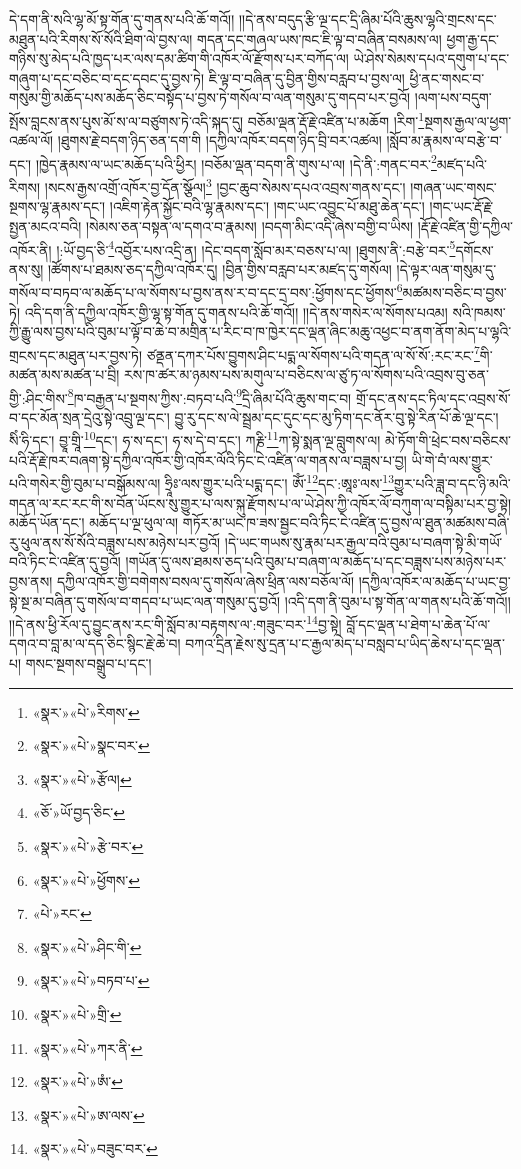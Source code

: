 དེ་དག་ནི་སའི་ལྷ་མོ་སྟ་གོན་དུ་གནས་པའི་ཆོ་གའོ།། །།དེ་ནས་བདུད་རྩི་ལྔ་དང་དྲི་ཞིམ་པོའི་ཆུས་ལྷའི་གྲངས་དང་མཐུན་པའི་རིགས་སོ་སོའི་ཐིག་ལེ་བྱས་ལ། གདན་དང་གཞལ་ཡས་ཁང་ཇི་ལྟ་བ་བཞིན་བསམས་ལ། ཕྱག་རྒྱ་དང་གཉིས་སུ་མེད་པའི་ཁྱད་པར་ལས་དམ་ཚིག་གི་འཁོར་ལོ་རྫོགས་པར་བཀོད་ལ། ཡེ་ཤེས་སེམས་དཔའ་དགུག་པ་དང་གཞུག་པ་དང་བཅིང་བ་དང་དབང་དུ་བྱས་ཏེ། ཇི་ལྟ་བ་བཞིན་དུ་བྱིན་གྱིས་བརླབ་པ་བྱས་ལ། ཕྱི་ནང་གསང་བ་གསུམ་གྱི་མཆོད་པས་མཆོད་ཅིང་བསྟོད་པ་བྱས་ཏེ་གསོལ་བ་ལན་གསུམ་དུ་གདབ་པར་བྱའོ། །ལག་པས་བདུག་སྤོས་བླངས་ནས་པུས་མོ་ས་ལ་བཙུགས་ཏེ་འདི་སྐད་དུ། བཅོམ་ལྡན་རྡོ་རྗེ་འཛིན་པ་མཆོག །རིག་\footnote{«སྣར་»«པེ་»རིགས་}སྔགས་རྒྱལ་ལ་ཕྱག་འཚལ་ལོ། །ཐུགས་རྗེ་བདག་ཉིད་ཅན་དག་གི །དཀྱིལ་འཁོར་བདག་ཉིད་བྲི་བར་འཚལ། །སློབ་མ་རྣམས་ལ་བརྩེ་བ་དང་། །ཁྱེད་རྣམས་ལ་ཡང་མཆོད་པའི་ཕྱིར། །བཅོམ་ལྡན་བདག་ནི་གུས་པ་ལ། །དེ་ནི་:གནང་བར་\footnote{«སྣར་»«པེ་»སྣང་བར་}མཛད་པའི་རིགས། །སངས་རྒྱས་འགྲོ་འཁོར་བྱ་དོན་སྩོལ།\footnote{«སྣར་»«པེ་»རྩོལ།} །བྱང་ཆུབ་སེམས་དཔའ་འབྲས་གནས་དང་། །གཞན་ཡང་གསང་སྔགས་ལྷ་རྣམས་དང་། །འཇིག་རྟེན་སྐྱོང་བའི་ལྷ་རྣམས་དང་། །གང་ཡང་འབྱུང་པོ་མཐུ་ཆེན་དང་། །གང་ཡང་རྡོ་རྗེ་སྤྱན་མངའ་བའི། །སེམས་ཅན་བསྟན་ལ་དགའ་བ་རྣམས། །བདག་མིང་འདི་ཞེས་བགྱི་བ་ཡིས། །རྡོ་རྗེ་འཛིན་གྱི་དཀྱིལ་འཁོར་ནི། །:ཡོ་བྱད་ཅི་\footnote{«ཅོ་»ཡོ་བྱད་ཅིང་}འབྱོར་པས་འདྲི་ན། །དེང་བདག་སློབ་མར་བཅས་པ་ལ། །ཐུགས་ནི་:བརྩེ་བར་\footnote{«སྣར་»«པེ་»རྩེ་བར་}དགོངས་ནས་སུ། །ཚོགས་པ་ཐམས་ཅད་དཀྱིལ་འཁོར་དུ། །བྱིན་གྱིས་བརླབ་པར་མཛད་དུ་གསོལ། །དེ་ལྟར་ལན་གསུམ་དུ་གསོལ་བ་བཏབ་ལ་མཆོད་པ་ལ་སོགས་པ་བྱས་ནས་ར་བ་དང་དྲ་བས་:ཕྱོགས་དང་ཕྱོགས་\footnote{«སྣར་»«པེ་»ཕྱོགས་}མཚམས་བཅིང་བ་བྱས་ཏེ། འདི་དག་ནི་དཀྱིལ་འཁོར་གྱི་ལྷ་སྟ་གོན་དུ་གནས་པའི་ཆོ་གའོ།། །།དེ་ནས་གསེར་ལ་སོགས་པའམ། སའི་ཁམས་ཀྱི་རྒྱུ་ལས་བྱས་པའི་བུམ་པ་ལྟོ་བ་ཆེ་བ་མགྲིན་པ་རིང་བ་ཁ་ཁྱེར་དང་ལྡན་ཞིང་མཆུ་འཕྱང་བ་ནག་ནོག་མེད་པ་ལྷའི་གྲངས་དང་མཐུན་པར་བྱས་ཏེ། ཙནྡན་དཀར་པོས་བྱུགས་ཤིང་པདྨ་ལ་སོགས་པའི་གདན་ལ་སོ་སོ་:རང་རང་\footnote{«པེ་»རང་}གི་མཚན་མས་མཚན་པ་བྲི། རས་ཁ་ཚར་མ་ཉམས་པས་མགུལ་པ་བཅིངས་ལ་ཙུ་ཏ་ལ་སོགས་པའི་འབྲས་བུ་ཅན་གྱི་:ཤིང་གིས་\footnote{«སྣར་»«པེ་»ཤིང་གི་}ཁ་བརྒྱན་པ་སྔགས་ཀྱིས་:བཏབ་པའི་\footnote{«སྣར་»«པེ་»བཏབ་པ་}དྲི་ཞིམ་པོའི་ཆུས་གང་བ། གྲོ་དང་ནས་དང་ཏིལ་དང་འབྲས་སོ་བ་དང་མོན་སྲན་དྲེའུ་སྟེ་འབྲུ་ལྔ་དང་། བྱུ་རུ་དང་ས་ལེ་སྦྲམ་དང་དུང་དང་མུ་ཏིག་དང་ནོར་བུ་སྟེ་རིན་པོ་ཆེ་ལྔ་དང་། སིཾ་ཧི་དང་། བྱཱ་གྲཱི་\footnote{«སྣར་»«པེ་»གྲི་}དང་། ཧ་ས་དང་། ཧ་ས་དེ་བ་དང་། ཀརྞི་\footnote{«སྣར་»«པེ་»ཀར་ནི་}ཀ་སྟེ་སྨན་ལྔ་བླུགས་ལ། མེ་ཏོག་གི་ཕྲེང་བས་བཅིངས་པའི་རྡོ་རྗེ་ཁར་བཞག་སྟེ་དཀྱིལ་འཁོར་གྱི་འཁོར་ལོའི་ཏིང་ངེ་འཛིན་ལ་གནས་ལ་བཟླས་པ་བྱ། ཡི་གེ་བཾ་ལས་གྱུར་པའི་གསེར་གྱི་བུམ་པ་བསྒོམས་ལ། ཧྲཱིཿ་ལས་གྱུར་པའི་པདྨ་དང་། ཨོཾ་\footnote{«སྣར་»«པེ་»ཨཾ་}དང་:ཨཱཿ་ལས་\footnote{«སྣར་»«པེ་»ཨ་ལས་}གྱུར་པའི་ཟླ་བ་དང་ཉི་མའི་གདན་ལ་རང་རང་གི་ས་བོན་ཡོངས་སུ་གྱུར་པ་ལས་སྐུ་རྫོགས་པ་ལ་ཡེ་ཤེས་ཀྱི་འཁོར་ལོ་བཀུག་ལ་བསྟིམ་པར་བྱ་སྟེ། མཆོད་ཡོན་དང་། མཆོད་པ་ལྔ་ཕུལ་ལ། གཏོར་མ་ཡང་ཁ་ཟས་སྦྱང་བའི་ཏིང་ངེ་འཛིན་དུ་བྱས་ལ་ཐུན་མཚམས་བཞི་རུ་ཕུལ་ནས་སོ་སོའི་བཟླས་པས་མཉེས་པར་བྱའོ། །དེ་ཡང་གཡས་སུ་རྣམ་པར་རྒྱལ་བའི་བུམ་པ་བཞག་སྟེ་མི་གཡོ་བའི་ཏིང་ངེ་འཛིན་དུ་བྱའོ། །གཡོན་དུ་ལས་ཐམས་ཅད་པའི་བུམ་པ་བཞག་ལ་མཆོད་པ་དང་བཟླས་པས་མཉེས་པར་བྱས་ནས། དཀྱིལ་འཁོར་གྱི་བགེགས་བསལ་དུ་གསོལ་ཞེས་ཕྲིན་ལས་བཅོལ་ལོ། །དཀྱིལ་འཁོར་ལ་མཆོད་པ་ཡང་བྱ་སྟེ་སྔ་མ་བཞིན་དུ་གསོལ་བ་གདབ་པ་ཡང་ལན་གསུམ་དུ་བྱའོ། །འདི་དག་ནི་བུམ་པ་སྟ་གོན་ལ་གནས་པའི་ཆོ་གའོ།། །།དེ་ནས་ཕྱི་རོལ་དུ་བྱུང་ནས་རང་གི་སློབ་མ་བརྟགས་ལ་:གཟུང་བར་\footnote{«སྣར་»«པེ་»བཟུང་བར་}བྱ་སྟེ། བློ་དང་ལྡན་པ་ཐེག་པ་ཆེན་པོ་ལ་དགའ་བ་བླ་མ་ལ་དད་ཅིང་སྙིང་རྗེ་ཆེ་བ། བཀའ་དྲིན་རྗེས་སུ་དྲན་པ་ང་རྒྱལ་མེད་པ་བསླབ་པ་ཡིད་ཆེས་པ་དང་ལྡན་པ། གསང་སྔགས་བསྒྲུབ་པ་དང་། 